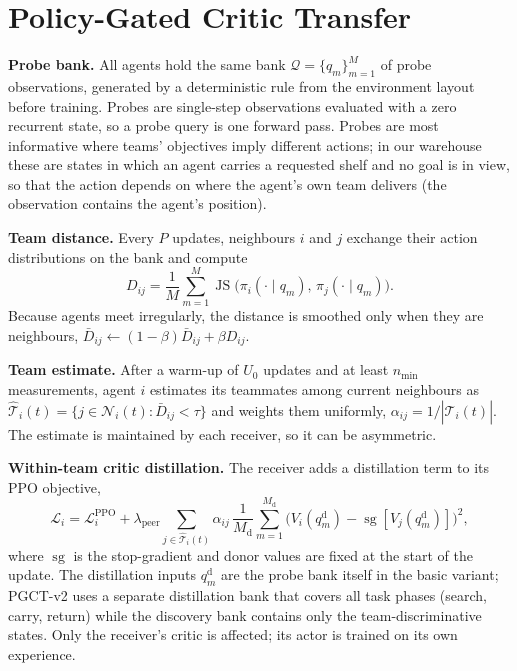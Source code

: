 \documentclass{article}
\newcommand{\sg}{\operatorname{sg}}
\newcommand{\JS}{\operatorname{JS}}
\newcommand{\ours}{PGCT}
\begin{document}
\section{Policy-Gated Critic Transfer}
\label{sec:method}
\textbf{Probe bank.} All agents hold the same bank $\mathcal{Q}=\{q_m\}_{m=1}^{M}$ of probe observations, generated by a
deterministic rule from the environment layout before training. Probes are single-step observations evaluated with a
zero recurrent state, so a probe query is one forward pass. Probes are most informative where teams' objectives imply
different actions; in our warehouse these are states in which an agent carries a requested shelf and no goal is in view,
so that the action depends on where the agent's own team delivers (the observation contains the agent's position).

\textbf{Team distance.} Every $P$ updates, neighbours $i$ and $j$ exchange their action distributions on the bank and
compute
\begin{equation}
  D_{ij} = \frac{1}{M}\sum_{m=1}^{M} \JS\big(\pi_i(\cdot\mid q_m),\, \pi_j(\cdot\mid q_m)\big).
\end{equation}
Because agents meet irregularly, the distance is smoothed only when they are neighbours,
$\bar D_{ij}\leftarrow(1-\beta)\bar D_{ij}+\beta D_{ij}$.

\textbf{Team estimate.} After a warm-up of $U_0$ updates and at least $n_{\min}$ measurements, agent $i$ estimates its
teammates among current neighbours as $\hat{\mathcal{T}}_i(t)=\{j\in\mathcal{N}_i(t): \bar D_{ij}<\tau\}$ and weights them
uniformly, $\alpha_{ij}=1/|\hat{\mathcal{T}}_i(t)|$. The estimate is maintained by each receiver, so it can be asymmetric.

\textbf{Within-team critic distillation.} The receiver adds a distillation term to its PPO objective,
\begin{equation}
  \mathcal{L}_i = \mathcal{L}^{\mathrm{PPO}}_i + \lambda_{\mathrm{peer}} \sum_{j\in\hat{\mathcal{T}}_i(t)} \alpha_{ij}\,
  \frac{1}{M_{\mathrm{d}}}\sum_{m=1}^{M_{\mathrm{d}}}\big(V_i(q^{\mathrm{d}}_m) - \sg[V_j(q^{\mathrm{d}}_m)]\big)^2 ,
  \label{eq:loss}
\end{equation}
where $\sg$ is the stop-gradient and donor values are fixed at the start of the update. The distillation inputs
$q^{\mathrm{d}}_m$ are the probe bank itself in the basic variant; \ours{}-v2 uses a separate distillation bank that
covers all task phases (search, carry, return) while the discovery bank contains only the team-discriminative states.
Only the receiver's critic is affected; its actor is trained on its own experience.
\end{document}
